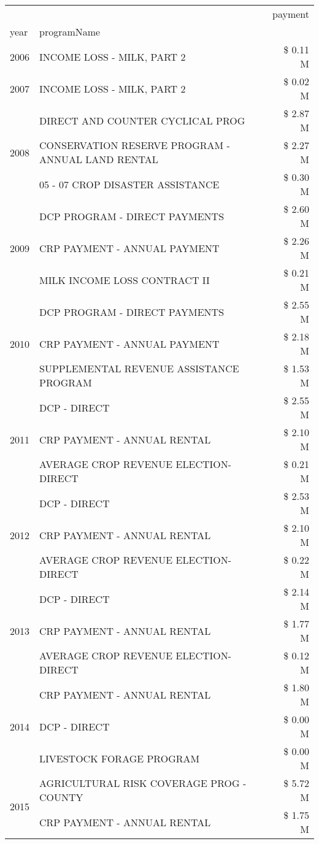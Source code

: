 \begin{tabular}{llr}
\toprule
 &  & payment \\
year & programName &  \\
\midrule
2006 & INCOME LOSS - MILK, PART 2 & \$ 0.11 M \\
\cline{1-3}
2007 & INCOME LOSS - MILK, PART 2 & \$ 0.02 M \\
\cline{1-3}
\multirow[t]{3}{*}{2008} & DIRECT AND COUNTER CYCLICAL PROG & \$ 2.87 M \\
 & CONSERVATION RESERVE PROGRAM - ANNUAL LAND RENTAL & \$ 2.27 M \\
 & 05 - 07 CROP DISASTER ASSISTANCE & \$ 0.30 M \\
\cline{1-3}
\multirow[t]{3}{*}{2009} & DCP PROGRAM - DIRECT PAYMENTS & \$ 2.60 M \\
 & CRP PAYMENT - ANNUAL PAYMENT & \$ 2.26 M \\
 & MILK INCOME LOSS CONTRACT II & \$ 0.21 M \\
\cline{1-3}
\multirow[t]{3}{*}{2010} & DCP PROGRAM - DIRECT PAYMENTS & \$ 2.55 M \\
 & CRP PAYMENT - ANNUAL PAYMENT & \$ 2.18 M \\
 & SUPPLEMENTAL REVENUE ASSISTANCE PROGRAM & \$ 1.53 M \\
\cline{1-3}
\multirow[t]{3}{*}{2011} & DCP - DIRECT & \$ 2.55 M \\
 & CRP PAYMENT - ANNUAL RENTAL & \$ 2.10 M \\
 & AVERAGE CROP REVENUE ELECTION-DIRECT & \$ 0.21 M \\
\cline{1-3}
\multirow[t]{3}{*}{2012} & DCP - DIRECT & \$ 2.53 M \\
 & CRP PAYMENT - ANNUAL RENTAL & \$ 2.10 M \\
 & AVERAGE CROP REVENUE ELECTION-DIRECT & \$ 0.22 M \\
\cline{1-3}
\multirow[t]{3}{*}{2013} & DCP - DIRECT & \$ 2.14 M \\
 & CRP PAYMENT - ANNUAL RENTAL & \$ 1.77 M \\
 & AVERAGE CROP REVENUE ELECTION-DIRECT & \$ 0.12 M \\
\cline{1-3}
\multirow[t]{3}{*}{2014} & CRP PAYMENT - ANNUAL RENTAL & \$ 1.80 M \\
 & DCP - DIRECT & \$ 0.00 M \\
 & LIVESTOCK FORAGE PROGRAM & \$ 0.00 M \\
\cline{1-3}
\multirow[t]{3}{*}{2015} & AGRICULTURAL RISK COVERAGE PROG - COUNTY & \$ 5.72 M \\
 & CRP PAYMENT - ANNUAL RENTAL & \$ 1.75 M \\

\end{tabular}
